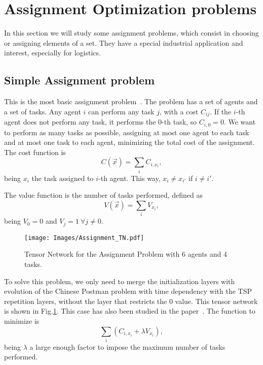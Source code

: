 \section{Assignment Optimization problems}
In this section we will study some assignment problems, which consist in choosing or assigning elements of a set. They have a special industrial application and interest, especially for logistics.

\subsection{Simple Assignment problem}
This is the most basic assignment problem~\cite{Assignment_Survey}. The problem has a set of agents and a set of tasks. Any agent $i$ can perform any task $j$, with a cost $C_{ij}$. If the $i$-th agent does not perform any task, it performs the $0$-th task, so $C_{i,0}=0$. We want to perform as many tasks as possible, assigning at most one agent to each task and at most one task to each agent, minimizing the total cost of the assignment. The cost function is
\begin{equation}
    C(\Vec{x})=\sum_{i} C_{i,x_i},
\end{equation}
being $x_i$ the task assigned to $i$-th agent. This way, $x_i\neq x_{i'}$ if $i\neq i'$.

The value function is the number of tasks performed, defined as
\begin{equation}
    V(\Vec{x})=\sum_{i} V_{x_i},
\end{equation}
being $V_0=0$ and $V_j=1\ \forall j\neq 0$.

\begin{figure}[h]
    \centering
    \texttt{[image: Images/Assignment\_TN.pdf]}
    \caption{Tensor Network for the Assignment Problem with 6 agents and 4 tasks.}
    \label{fig: Assignment TN}
\end{figure}
To solve this problem, we only need to merge the initialization layers with evolution of the Chinese Postman problem with time dependency with the TSP repetition layers, without the layer that restricts the $0$ value. This tensor network is shown in Fig.\ref{fig: Assignment TN}. This case has also been studied in the paper~\cite{TSP_TN}. The function to minimize is
\begin{equation}
    \sum_{i} \left(C_{i,x_i} +\lambda V_{x_i}\right),
\end{equation}
being $\lambda$ a large enough factor to impose the maximum number of tasks performed.

